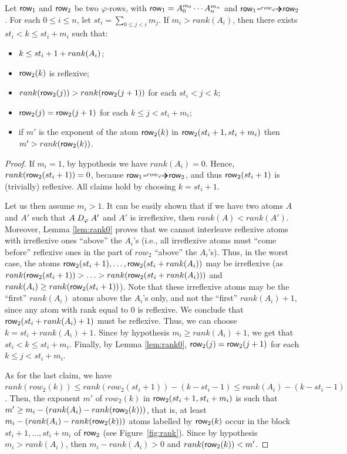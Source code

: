 \begin{lemma}\label{lem:rank}
Let $\text{{\sffamily row}}_1$ and $\text{{\sffamily row}}_2$ be two $\varphi$-rows, with
$\text{{\sffamily row}}_1= A_0^{m_0}\cdots A_n^{m_n}$ and $\row_1\rownext \row_2$. 
For each $0\leq i\leq n$, let $st_i=\sum_{0\leq j <i} m_j$.
If $m_i > rank(A_i)$, then there exists $st_i<k\leq st_i + m_i $
such that:
\begin{itemize}
\item $k\leq st_i+1+rank(A_i)$;
\item $\text{{\sffamily row}}_2(k)$ is reflexive;
\item $rank(\text{{\sffamily row}}_2(j))>rank(\text{{\sffamily row}}_2(j+1))$ for each $st_i<j< k$; 
\item $\text{{\sffamily row}}_2(j)=\text{{\sffamily row}}_2(j+1)$ for each $k \leq j< st_i + m_i$;
\item if $m'$ is the exponent of the atom $\text{{\sffamily row}}_2(k)$ in $\text{{\sffamily row}}_2(st_i+1, st_i+m_i)$ then  $m'>  rank(\text{{\sffamily row}}_2(k)) $.
\end{itemize}
\end{lemma}
\begin{proof}
%
If $m_i=1$, by hypothesis we have $ rank(A_i) = 0$. Hence, $rank(\text{{\sffamily row}}_2(st_i+1)) = 0$, because $\row_1\rownext \row_2$, and thus $\text{{\sffamily row}}_2(st_i+1)$ is (trivially) reflexive. All claims hold by choosing $k=st_i+1$. 

Let us then assume $m_i>1$. %
It can be easily shown that if we have two atoms $A$ and $A'$ such that $A\mathrel{D_\varphi} A'$ and $A'$ is irreflexive, then $rank(A)< rank(A')$.
Moreover, Lemma \ref{lem:rank0} proves that we cannot interleave reflexive atoms with irreflexive ones ``above'' the $A_i$'s (i.e., all irreflexive atoms must ``come before'' reflexive ones in the part of $row_2$ ``above'' the $A_i$'s).
Thus, in the worst case, the atoms $\text{{\sffamily row}}_2(st_i+1),\ldots ,\text{{\sffamily row}}_2(st_i+rank(A_i))$
may be irreflexive (as $rank(\text{{\sffamily row}}_2(st_i+1))>\ldots >rank(\text{{\sffamily row}}_2(st_i+rank(A_i)))$ and $rank(A_i)\geq rank(\text{{\sffamily row}}_2(st_i+1))$). Note that these irreflexive atoms may be the ``first''  $rank(A_i)$
atoms above the $A_i$'s only, and not the ``first'' $rank(A_i)+1$,
since any atom with rank equal to $0$ is reflexive. 
%
We conclude that $\text{{\sffamily row}}_2(st_i+rank(A_i)+1)$ must be reflexive. %
Thus, we can choose $k=st_i+rank(A_i)+1$. Since by hypothesis $m_i\geq rank(A_i)+1$, we get that
$st_i<k\leq st_i+m_i$. Finally, by Lemma \ref{lem:rank0}, $\text{{\sffamily row}}_2(j)=\text{{\sffamily row}}_2(j+1)$ for each $k \leq j< st_i + m_i$.

As for the last claim,  we have $rank(row_2(k))\leq rank(row_2(st_i+1)) - (k - st_i -1) \leq rank(A_i) - (k - st_i -1)$. 
Then, the exponent $m'$ of $row_2(k)$ in $\text{{\sffamily row}}_2(st_i+1, st_i+m_i)$ is such that
$m'\geq m_i - (rank(A_i) - rank(\text{{\sffamily row}}_2(k)))$,
that is, at least $m_i - (rank(A_i) - rank(\text{{\sffamily row}}_2(k)))$ atoms 
labelled by $\text{{\sffamily row}}_2(k)$ occur in the block $st_i+1,\ldots, st_i + m_i$  
of $\text{{\sffamily row}}_2$ (see Figure~\ref{fig:rank}). 
Since by hypothesis $m_i>rank(A_i)$, then $m_i-rank(A_i)>0$ and 
$rank(\text{{\sffamily row}}_2(k)) < m'$.
\end{proof}

